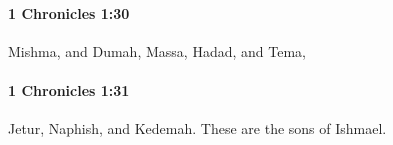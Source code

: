 		\paragraph{1 Chronicles 1:30} %
			\label{1CHRONICLES-1-30}

			Mishma, and Dumah, Massa, Hadad, and Tema,


		\paragraph{1 Chronicles 1:31} %
			\label{1CHRONICLES-1-31}

			Jetur, Naphish, and Kedemah. These are the sons of Ishmael.


